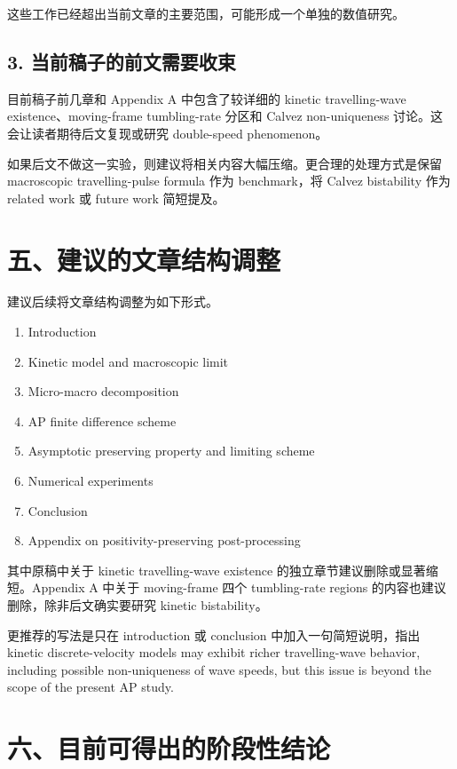 \documentclass[11pt]{ctexart}
\begin{document}
这些工作已经超出当前文章的主要范围，可能形成一个单独的数值研究。

\subsection*{3. 当前稿子的前文需要收束}

目前稿子前几章和 Appendix A 中包含了较详细的 kinetic travelling-wave existence、moving-frame tumbling-rate 分区和 Calvez non-uniqueness 讨论。这会让读者期待后文复现或研究 double-speed phenomenon。

如果后文不做这一实验，则建议将相关内容大幅压缩。更合理的处理方式是保留 macroscopic travelling-pulse formula 作为 benchmark，将 Calvez bistability 作为 related work 或 future work 简短提及。

\section*{五、建议的文章结构调整}

建议后续将文章结构调整为如下形式。

\begin{enumerate}[leftmargin=2em]
    \item Introduction
    \item Kinetic model and macroscopic limit
    \item Micro-macro decomposition
    \item AP finite difference scheme
    \item Asymptotic preserving property and limiting scheme
    \item Numerical experiments
    \item Conclusion
    \item Appendix on positivity-preserving post-processing
\end{enumerate}

其中原稿中关于 kinetic travelling-wave existence 的独立章节建议删除或显著缩短。Appendix A 中关于 moving-frame 四个 tumbling-rate regions 的内容也建议删除，除非后文确实要研究 kinetic bistability。

更推荐的写法是只在 introduction 或 conclusion 中加入一句简短说明，指出 kinetic discrete-velocity models may exhibit richer travelling-wave behavior, including possible non-uniqueness of wave speeds, but this issue is beyond the scope of the present AP study.

\section*{六、目前可得出的阶段性结论}
\end{document}
